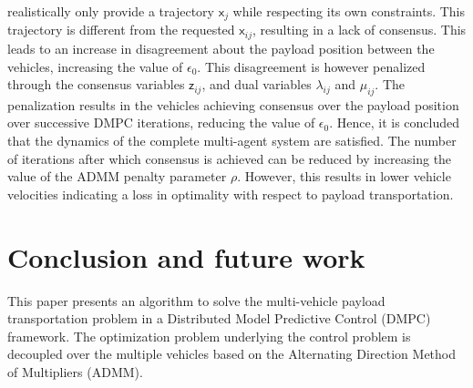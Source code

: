 \documentclass[letterpaper, 10 pt, conference]{ieeeconf}
\newcommand{\cx}{\textsf{x}}
\newcommand{\cz}{\textsf{z}}
\begin{document}
 realistically only provide a trajectory $\cx_j$ while respecting its own constraints. This trajectory is different from the requested $\cx_{ij}$, resulting in a lack of consensus. This leads to an increase in disagreement about the payload position between the vehicles, increasing the value of $\epsilon_0$. This disagreement is however penalized through the consensus variables $\cz_{ij}$, and dual variables $\lambda_{ij}$ and $\mu_{ij}$. The penalization results in the vehicles achieving consensus over the payload position over successive DMPC iterations, reducing the value of $\epsilon_0$. Hence, it is concluded that the dynamics of the complete multi-agent system are satisfied. The number of iterations after which consensus is achieved can be reduced by increasing the value of the ADMM penalty parameter $\rho$. However, this results in lower vehicle velocities indicating a loss in optimality with respect to payload transportation.
 
 \section{Conclusion and future work}
This paper presents an algorithm to solve the multi-vehicle payload transportation problem in a Distributed Model Predictive Control (DMPC) framework. The optimization problem underlying the control problem is decoupled over the multiple vehicles based on the Alternating Direction Method of Multipliers (ADMM). 
\end{document}
